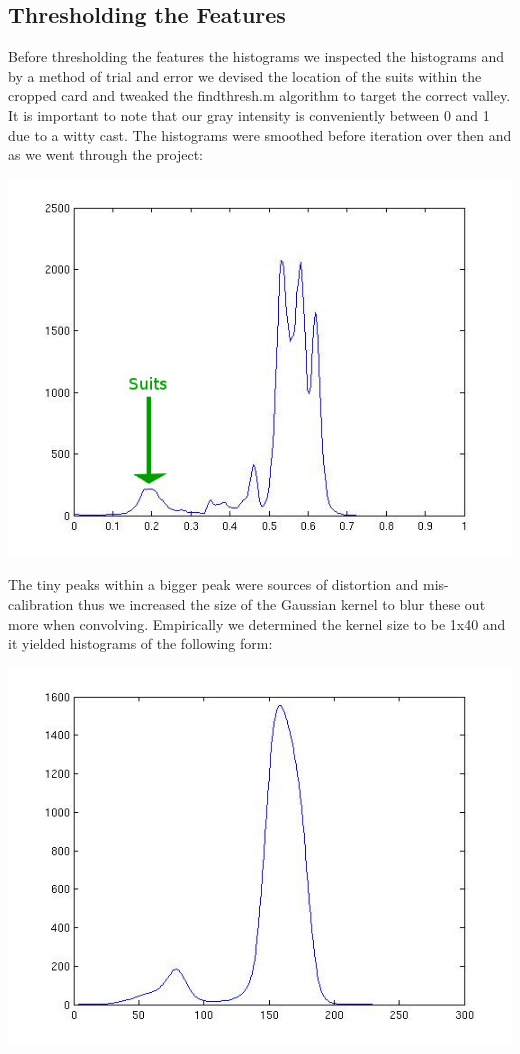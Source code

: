 \documentclass[11pt]{article}
\theoremstyle{plain}
\theoremstyle{definition}
\begin{document}
\subsection{Thresholding the Features}
Before thresholding the features the histograms 
we inspected the histograms and by a method of trial and error we devised the location of the suits within the cropped card and tweaked the 
findthresh.m algorithm to target the correct
valley. It is important to note that our gray
intensity is conveniently between 0 and 1 due to a witty cast. The histograms were smoothed before iteration over then and as we went through the project:
\begin{center}
        \includegraphics[scale=0.7]{suit.jpg}
\end{center}
The tiny peaks within a bigger peak were sources of distortion and mis-calibration thus we increased the size of the Gaussian kernel to blur these out more when convolving. Empirically we determined the kernel size to be 1x40 and it yielded histograms of the following form:
\begin{center}
\includegraphics[scale=0.6]{histogram2.jpg}
\end{center}
\end{document}
